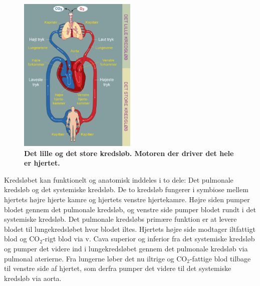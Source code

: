 \begin{figure}[H]
\includegraphics[width =0.5\textwidth , center]{billeder/hjertet}
\caption{\textbf{Det lille og det store kredsløb. Motoren der driver det hele er hjertet. \cite{hjertet}}}
\end{figure}
Kredsløbet kan funktionelt og anatomisk inddeles i to dele: Det pulmonale kredsløb og det systemiske kredsløb.
De to kredsløb fungerer i symbiose mellem hjertets højre hjerte kamre og hjertets venstre hjertekamre. Højre siden pumper blodet gennem det pulmonale kredsløb, og venstre side pumper blodet rundt i det systemiske kredsløb.
Det pulmonale kredsløbs primære funktion er at levere blodet til lungekredsløbet hvor blodet iltes. Hjertets højre side modtager iltfattigt blod og CO$_{2}$-rigt blod via v. Cava superior og inferior fra det systemiske kredsløb og pumper det videre ind i lungekredsløbet gennem det pulmonale kredsløb via pulmonal aterierne. Fra lungerne løber det nu iltrige og CO$_{2}$-fattige blod tilbage til venstre side af hjertet, som derfra pumper det videre til det systemiske kredsløb via aorta. \cite{pulmonal} 
